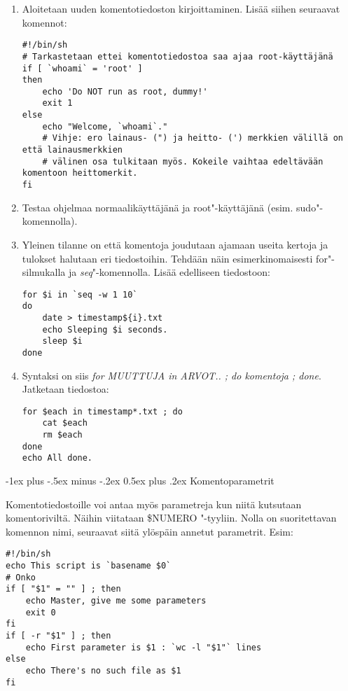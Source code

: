 \documentclass[12pt,portrait,a4]{article}
\makeatletter
\renewcommand{\section}{\@startsection{section}{1}{0mm}%
                                {-1ex plus -.5ex minus -.2ex}%
                                {0.5ex plus .2ex}%
                                {\normalfont\large\bfseries}}
\makeatother
\begin{document}
\begin{enumerate}
\item Aloitetaan uuden komentotiedoston kirjoittaminen.  Lisää siihen
seuraavat komennot:
\begin{verbatim}
#!/bin/sh
# Tarkastetaan ettei komentotiedostoa saa ajaa root-käyttäjänä
if [ `whoami` = 'root' ]
then
    echo 'Do NOT run as root, dummy!'
    exit 1
else
    echo "Welcome, `whoami`."
    # Vihje: ero lainaus- (") ja heitto- (') merkkien välillä on että lainausmerkkien
    # välinen osa tulkitaan myös. Kokeile vaihtaa edeltävään komentoon heittomerkit.
fi
\end{verbatim}
\item Testaa ohjelmaa normaalikäyttäjänä ja root"-käyttäjänä (esim.
sudo"-komennolla).
\item Yleinen tilanne on että komentoja joudutaan ajamaan useita kertoja ja
tulokset halutaan eri tiedostoihin.  Tehdään näin esimerkinomaisesti
for"-silmukalla ja \emph{seq}"-komennolla.  Lisää edelliseen tiedostoon:
\begin{verbatim}
for $i in `seq -w 1 10`
do
    date > timestamp${i}.txt
    echo Sleeping $i seconds.
    sleep $i
done
\end{verbatim}
\item Syntaksi on siis \emph{for MUUTTUJA in ARVOT.. ; do komentoja ; done}.
Jatketaan tiedostoa:
\begin{verbatim}
for $each in timestamp*.txt ; do
    cat $each
    rm $each
done
echo All done.
\end{verbatim}

\end{enumerate}

\section{Komentoparametrit}

Komentotiedostoille voi antaa myös parametreja kun niitä kutsutaan
komentoriviltä.  Näihin viitataan \$NUMERO "-tyyliin.  Nolla on
suoritettavan komennon nimi, seuraavat siitä ylöspäin annetut parametrit. 
Esim:

\begin{verbatim}
#!/bin/sh
echo This script is `basename $0`
# Onko 
if [ "$1" = "" ] ; then
    echo Master, give me some parameters
    exit 0
fi
if [ -r "$1" ] ; then
    echo First parameter is $1 : `wc -l "$1"` lines
else
    echo There's no such file as $1
fi
\end{verbatim}
\end{document}
